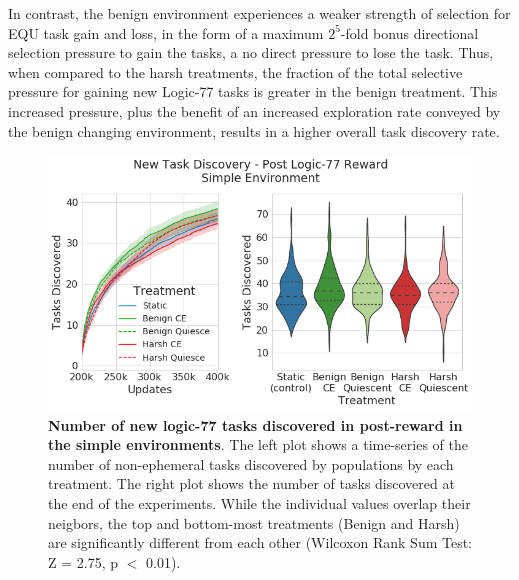 \documentclass[PhD]{msu-thesis}
\begin{document}
In contrast, the benign environment experiences a weaker strength of selection for EQU task gain and loss, in the form of a maximum $2^5$-fold bonus directional selection pressure to gain the tasks, a no direct pressure to lose the task. Thus, when compared to the harsh treatments, the fraction of the total selective pressure for gaining new Logic-77 tasks is greater in the benign treatment. This increased pressure, plus the benefit of an increased exploration rate conveyed by the benign changing environment, results in a higher overall task discovery rate.

	\begin{figure}[!h]
	\includegraphics[width=0.95\columnwidth]{figures/LTE/lte-simple-post_reward_task_discovery.png}
	\caption{\textbf{Number of new logic-77 tasks discovered in post-reward in the simple environments}. The left plot shows a time-series of the number of non-ephemeral tasks discovered by populations by each treatment. The right plot shows the number of tasks discovered at the end of the experiments. While the individual values overlap their neigbors, the top and bottom-most treatments (Benign and Harsh) are significantly different from each other (Wilcoxon Rank Sum Test: Z = 2.75, p $<$ 0.01). %
	}
	\label{fig:postreward_task_discovery}
	\end{figure} 
\end{document}

